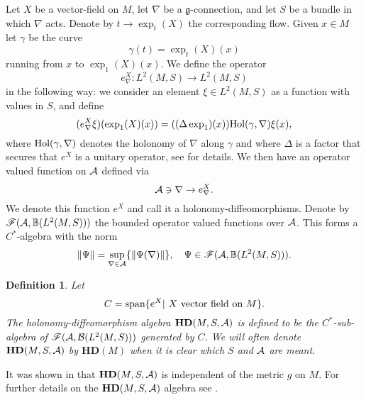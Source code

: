 \documentclass[letterpaper,12pt]{article}
\newcommand{\nn}{\nonumber}
\def\ca{{\cal A}}
\def\cb{{\cal B}}
\def\cd{{\cal D}}
\def\ch{{\cal H}}
\newtheorem{definition}[thm]{Definition}
\begin{document}
Let $X$ be a vector-field on $M$,  let $\nabla$ be a $\mathfrak{g}$-connection, and let $S$ be a bundle in which $\nabla $ acts.  Denote by $t\to \exp_t(X)$ the corresponding flow. Given $x\in M$ let $\gamma$ be the curve  
$$\gamma (t)=\exp_{t} (X) (x) $$
running from $x$ to $\exp_1 (X)(x)$. We define the operator 
$$e^X_\nabla :L^2 (M , S) \to L^2 (M ,  S )$$
in the following way:
we consider an element $\xi \in L^2 (M ,  S)$ as a function with values in $S$, and define 
\begin{equation}
  (e^X_\nabla \xi )(\exp_1(X) (x))=  ((\Delta \exp_1) (x))  \hbox{Hol}(\gamma, \nabla) \xi (x)   ,
  \label{chopin1}
 \end{equation}
where $\hbox{Hol}(\gamma, \nabla)$ denotes the holonomy of $\nabla$ along $\gamma$ and where $\Delta$ is a factor that secures that $e^X$ is a unitary operator, see \cite{AGnew} for details. %
%
We then have an operator valued function on $\ca$ defined via 
\begin{equation}
\ca \ni \nabla \to e^X_\nabla  . 
\nn
\end{equation}
We denote this function $e^X$ and call it a holonomy-diffeomorphisms. 
Denote by $\mathscr{F} (\ca , \mathbb{B} (L^2(M, S) ))$ the bounded operator valued functions over $\ca$. This forms a $C^*$-algebra with the norm
$$\| \Psi \| =  \sup_{\nabla \in \ca} \{\|  \Psi (\nabla )\| \}, \quad \Psi \in  \mathscr{F} (\ca , \mathbb{B} (L^2(M, S )) ). $$ 
    
  


\begin{definition}
Let 
$$C =   \hbox{span} \{ e^X | \ X \hbox{ vector field on  } M\}  . $$
The holonomy-diffeomorphism algebra $\mathbf{H D} (M,S,\ca)   $ is defined to be the $C^*$-sub-algebra of  $\mathscr{F} (\ca , \cb (L^2(M,S )) )$ generated by $C$.
We will often denote $\mathbf{H D} (M,S,\ca)   $ by  $\mathbf{H D}  (M)$ when it is clear which $S$ and $\ca$ are meant.
\end{definition}

It was shown in \cite{AGnew} that  $\mathbf{H D} (M,S,\ca)   $ is independent of the metric $g$ on $M$. For further details on the $\mathbf{H D} (M,S,\ca)   $ algebra see \cite{Aastrup:2014ppa}. 
\end{document}
